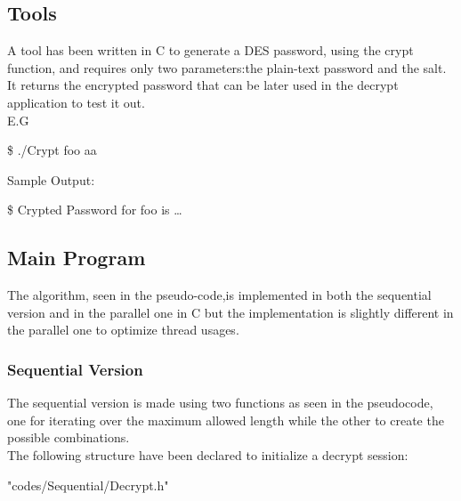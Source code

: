 \documentclass[10pt,twocolumn,letterpaper]{article}
\newenvironment{Shaded}{}{}
\newcommand{\ExtensionTok}[1]{#1}
\newcommand{\NormalTok}[1]{#1}
\begin{document}
\subsection{Tools}
A tool has been written in C to generate a DES password, using the crypt function, and requires only two parameters:the plain-text 
password and the salt.\\
It returns the encrypted password that can be later used in the decrypt application to test it out.\\
E.G\\
\begin{Shaded}
\begin{Highlighting}[]
\NormalTok{\$ }\ExtensionTok{./Crypt foo aa}
\end{Highlighting}
\end{Shaded}
Sample Output:\\
\begin{Shaded}
\begin{Highlighting}[]
\NormalTok{\$ }\ExtensionTok{Crypted Password for foo is \ldots}
\end{Highlighting}
\end{Shaded}

\subsection{Main Program}
The algorithm, seen in the pseudo-code,is implemented in both the sequential version and in the parallel one in C but the implementation 
is slightly different in the parallel one to optimize thread usages.\\
\subsubsection{Sequential Version}
The sequential version is made using two functions as seen in the pseudocode, one for iterating over the maximum allowed length while 
the other to create the possible combinations.\\
The following structure have been declared to initialize a decrypt session:
\begin{lstinputlisting}[language=C,style=CSnippetStyle,caption=Data Structure Definition ]{
	"codes/Sequential/Decrypt.h"}
\end{lstinputlisting}
\end{document}
